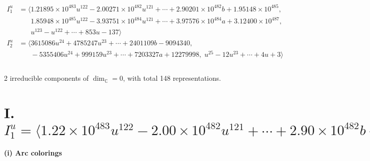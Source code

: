 \documentclass[1p]{elsarticle_modified}
\theoremstyle{definition}
\begin{document}
\begin{align*}
I^u_{1}&=\langle 
1.21895\times10^{483} u^{122}-2.00271\times10^{482} u^{121}+\cdots+2.90201\times10^{482} b+1.95148\times10^{485},\\
\phantom{I^u_{1}}&\phantom{= \langle  }1.85948\times10^{485} u^{122}-3.93751\times10^{484} u^{121}+\cdots+3.97576\times10^{484} a+3.12400\times10^{487},\\
\phantom{I^u_{1}}&\phantom{= \langle  }u^{123}- u^{122}+\cdots+853 u-137\rangle \\
I^u_{2}&=\langle 
3615086 u^{24}+4785247 u^{23}+\cdots+2401109 b-9094340,\\
\phantom{I^u_{2}}&\phantom{= \langle  }-5355406 u^{24}+999159 u^{23}+\cdots+7203327 a+12279998,\;u^{25}-12 u^{23}+\cdots+4 u+3\rangle \\
\\
\end{align*}
\raggedright * 2 irreducible components of $\dim_{\mathbb{C}}=0$, with total 148 representations.\\
\newpage
\renewcommand{\arraystretch}{1}
\centering \section*{I. $I^u_{1}= \langle 1.22\times10^{483} u^{122}-2.00\times10^{482} u^{121}+\cdots+2.90\times10^{482} b+1.95\times10^{485},\;1.86\times10^{485} u^{122}-3.94\times10^{484} u^{121}+\cdots+3.98\times10^{484} a+3.12\times10^{487},\;u^{123}- u^{122}+\cdots+853 u-137 \rangle$}
\flushleft \textbf{(i) Arc colorings}\\
\end{document}
